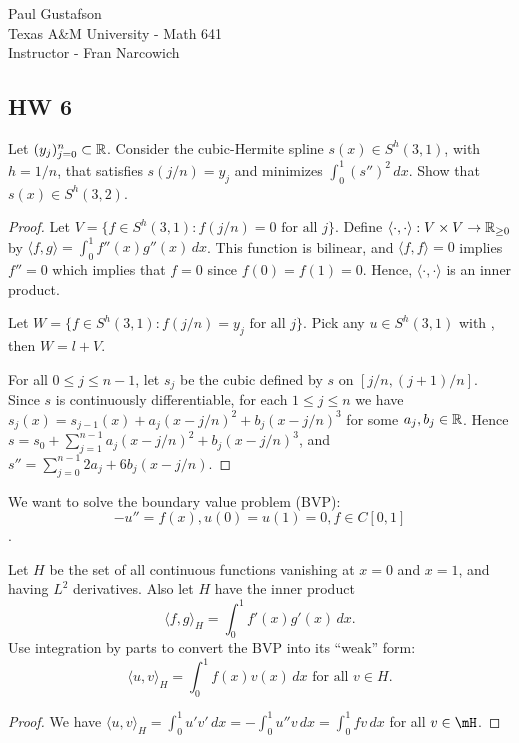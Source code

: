 \documentclass{article}
\begin{document}
\noindent Paul Gustafson\\
\noindent Texas A\&M University - Math 641\\ 
\noindent Instructor - Fran Narcowich

\subsection*{HW 6}
 Let $(y_j)_{j=0}^n \subset \mathbb{R}$. Consider the cubic-Hermite spline $s(x) \in S^h(3,1)$, with $h = 1/n$, that satisfies $s(j/n) = y_j$ and minimizes $\int_0^1 (s'')^2 \, dx$. Show that $s(x) \in S^h(3,2)$.
\begin{proof}
Let $V = \{f \in S^h(3,1) : f(j/n) = 0 \text{ for all } j\}$.  Define $\langle \cdot, \cdot \rangle : V \times V \to \mathbb{R}_{\ge 0}$ by $\langle f, g \rangle = \int_0^1 f''(x) g''(x) \, dx$.  This function is bilinear, and $\langle f, f \rangle = 0$ implies $f'' = 0$ which implies that $f = 0$ since $f(0) = f(1) = 0$. Hence, $\langle \cdot, \cdot \rangle$ is an inner product.

Let $W = \{f \in S^h(3,1) : f(j/n) = y_j \text{ for all } j\}$.  Pick any $u \in S^h(3,1)$ with , then $W = l + V$.


For all $0 \le j \le n-1$, let $s_j$ be the cubic defined by $s$ on $[j/n, (j+1)/n]$. Since $s$ is continuously differentiable, for each $1 \le j \le n$ we have $s_{j}(x) = s_{j-1}(x) + a_j(x - j/n)^2 + b_j(x - j/n)^3$ for some $a_j, b_j \in \mathbb{R}$.    %
Hence $s = s_0 + \sum_{j = 1}^{n-1} a_j(x - j/n)^2 + b_j(x - j/n)^3$, and $s'' = \sum_{j=0}^{n-1} 2 a_j + 6 b_j(x - j/n)$.




\end{proof}

 We want to solve the boundary value problem (BVP): 
$$-u'' = f(x), u(0) = u(1) = 0, f \in C[0,1]$$.

 Let $H$ be the set of all continuous functions vanishing at $x = 0$ and $x = 1$, and having $L^2$ derivatives. Also let $H$ have the inner product
$$\langle f, g \rangle_H = \int_0^1 f'(x) g'(x) \, dx.$$
Use integration by parts to convert the BVP into its ``weak'' form:
$$\langle u, v \rangle_H = \int_0^1 f(x) v(x) \, dx \text{ for all } v \in H.$$
\begin{proof}
We have $\langle u, v \rangle_H = \int_0^1 u' v' \, dx =  - \int_0^1 u'' v \, dx = \int_0^1 f v \, dx$ for all $v \in \mH$.
\end{proof}
\end{document}
